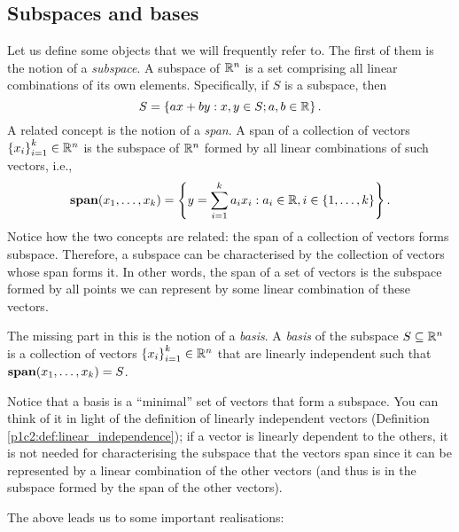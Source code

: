 \subsection{Subspaces and bases}

Let us define some objects that we will frequently refer to. The first of them is the notion of a \emph{subspace}. A subspace of $\mathbb{R}^n$ is a set comprising all linear combinations of its own elements. Specifically, if $S$ is a subspace, then
%
\begin{equation*}
	S = \left\{ ax + by : x,y \in S; a,b \in \mathbb{R} \right \}.
\end{equation*}
%
A related concept is the notion of a \emph{span}. A span of a collection of vectors $\left\{ x_i \right \}_{i=1}^k \in \mathbb{R}^n$ is the subspace of $\mathbb{R}^n$ formed by all linear combinations of such vectors, i.e., 
%
\begin{equation*}
	\mathop{\bf span}(x_1,\dots, x_k) = \left\{ y = \sum_{i=1}^k a_ix_i : a_i \in \mathbb{R}, i \in \left\{ 1,\dots, k \right \} \right \}. 
\end{equation*}
%
Notice how the two concepts are related: the span of a collection of vectors forms subspace. Therefore, a subspace can be characterised by the collection of vectors whose span forms it. In other words, the span of a set of vectors is the subspace formed by all points we can represent by some linear combination of these vectors. 

The missing part in this is the notion of a \emph{basis}. A \emph{basis} of the subspace $S \subseteq \mathbb{R}^n$ is a collection of vectors $\left\{ x_i \right \}_{i=1}^k \in \mathbb{R}^n$ that are linearly independent such that $\mathop{\bf span}(x_1,\dots, x_k) = S$. 

Notice that a basis is a ``minimal'' set of vectors that form a subspace. You can think of it in light of the definition of linearly independent vectors (Definition \ref{p1c2:def:linear_independence}); if a vector is linearly dependent to the others, it is not needed for characterising the subspace that the vectors span since it can be represented by a linear combination of the other vectors (and thus is in the subspace formed by the span of the other vectors).

The above leads us to some important realisations:

